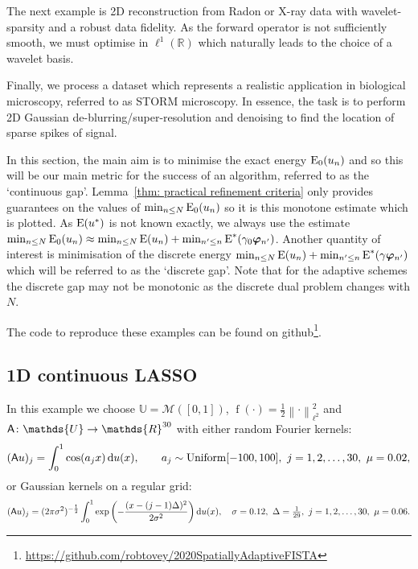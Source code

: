 \documentclass[smallextended]{svjour3}
\let\F\mathds\let\C\mathcal\newcommand{\R}{\F{R}}\newcommand{\A}{\tens{A}}
\newcommand{\norm}[1]{{\left\lVert #1 \right\rVert}}
\newcommand{\op}[1]{\operatorname{#1}}
\newcommand{\1}{\F{1}}
\newcommand{\diff}{\mathop{}\!\mathrm{d}}
\newcommand*{\var}[1]{%
	\IfEqCase{#1}{%
		{0}{u}%
		{1}{v}%
		{2}{w}%
	}[u#1]%
}
\newcommand*{\vars}[1]{%
	\IfEqCase{#1}{%
		{0}{\alpha}%
		{1}{\beta}%
		{2}{\gamma}%
		{3}{a}%
		{4}{b}%
		{5}{c}%
	}[k#1]%
}
\begin{document}
	The next example is 2D reconstruction from Radon or X-ray data with wavelet-sparsity and a robust data fidelity. As the forward operator is not sufficiently smooth, we must optimise in $\ell^1(\R)$ which naturally leads to the choice of a wavelet basis. 
	
	Finally, we process a dataset which represents a realistic application in biological microscopy, referred to as STORM microscopy. In essence, the task is to perform 2D Gaussian de-blurring/super-resolution and denoising to find the location of sparse spikes of signal.
	
	In this section, the main aim is to minimise the exact energy $\op{E}_0(\var0_n)$ and so this will be our main metric for the success of an algorithm, referred to as the `continuous gap'. Lemma~\ref{thm: practical refinement criteria} only provides guarantees on the values of $\min_{n\leq N}\op{E}_0(\var0_n)$ so it is this monotone estimate which is plotted. As $\op{E}(\var0^*)$ is not known exactly, we always use the estimate $\min_{n\leq N}\op{E}_0(\var0_n) \approx \min_{n\leq N}\op{E}(\var0_n) + \min_{n'\leq n}\op{E}^*(\vars2_0\vec{\varphi}_{n'})$. Another quantity of interest is minimisation of the discrete energy $\min_{n\leq N}\op{E}(\var0_n) + \min_{n'\leq n}\op{E}^*(\vars2\vec{\varphi}_{n'})$ which will be referred to as the `discrete gap'. Note that for the adaptive schemes the discrete gap may not be monotonic as the discrete dual problem changes with $N$.
	
	The code to reproduce these examples can be found on github\footnote{\href{https://github.com/robtovey/2020SpatiallyAdaptiveFISTA}{https://github.com/robtovey/2020SpatiallyAdaptiveFISTA}}.
	
	
	\subsection{1D continuous LASSO}\label{sec: 1D Lasso examples}
	In this example we choose $\F{U}=\C M([0,1])$, $\op{f}(\cdot)=\frac12\norm{\cdot}_{\ell^2}^2$ and $\A\colon \F{U}\to \R^{30}$ with either random Fourier kernels:
	\begin{equation}
		(\A\var0)_j = \int_0^1\cos(\vars3_jx)\diff\var0(x), \qquad \vars3_j\sim \op{Uniform}[-100,100],\ j=1,2,\ldots,30,\ \mu =0.02, 
	\end{equation}
	or Gaussian kernels on a regular grid:
	\begin{equation}
		(\A\var0)_j = (2\pi\sigma^2)^{-\frac12}\int_0^1\exp\left(-\frac{(x-(j-1)\Delta)^2}{2\sigma^2}\right)\diff\var0(x), \quad \sigma=0.12,\ \Delta = \tfrac1{29},\ j=1,2,\ldots,30,\ \mu=0.06.
	\end{equation}
	
\end{document}
